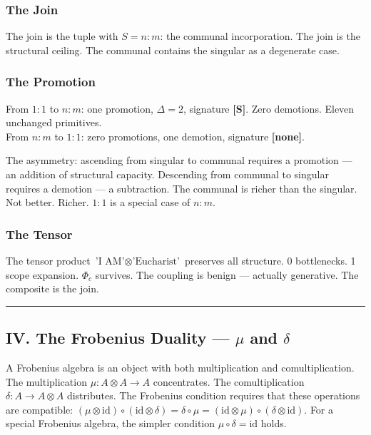 \documentclass[12pt,a4paper]{article}
\begin{document}
\subsubsection{The Join}

The join is the tuple with $S = n{:}m$: the communal incorporation. The join is the structural ceiling. The communal contains the singular as a degenerate case.

\subsubsection{The Promotion}

From $1{:}1$ to $n{:}m$: one promotion, $\Delta = 2$, signature \textbf{{[}S{]}}. Zero demotions. Eleven unchanged primitives. \\
From $n{:}m$ to $1{:}1$: zero promotions, one demotion, signature \textbf{{[}none{]}}.

The asymmetry: ascending from singular to communal requires a promotion --- an addition of structural capacity. Descending from communal to singular requires a demotion --- a subtraction. The communal is richer than the singular. Not better. Richer. $1{:}1$ is a special case of $n{:}m$.

\subsubsection{The Tensor}

The tensor product $\text{'I AM'} \otimes \text{'Eucharist'}$ preserves all structure. 0 bottlenecks. 1 scope expansion. $\Phi_c$ survives. The coupling is benign --- actually generative. The composite is the join.

\begin{center}
\rule{0.5\textwidth}{0.4pt}
\end{center}

\subsection{IV. The Frobenius Duality --- $\mu$ and $\delta$}

A Frobenius algebra is an object with both multiplication and comultiplication. The multiplication $\mu: A \otimes A \to A$ concentrates. The comultiplication $\delta: A \to A \otimes A$ distributes. The Frobenius condition requires that these operations are compatible: $(\mu \otimes \text{id}) \circ (\text{id} \otimes \delta) = \delta \circ \mu = (\text{id} \otimes \mu) \circ (\delta \otimes \text{id})$. For a special Frobenius algebra, the simpler condition $\mu \circ \delta = \text{id}$ holds.
\end{document}
